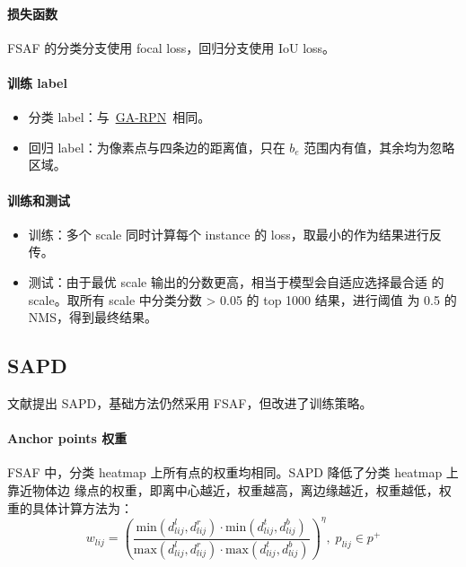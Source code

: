 \paragraph{损失函数}
FSAF 的分类分支使用 focal loss，回归分支使用 IoU loss。

\paragraph{训练 label}
\begin{itemize}
\item 分类 label：与~\hyperref[subsubsec:GA-RPN]{GA-RPN}~相同。
  \item 回归 label：为像素点与四条边的距离值，只在 $b_e$ 范围内有值，其余均为忽略区域。
\end{itemize}

\paragraph{训练和测试}
\begin{itemize}
  \item 训练：多个 scale 同时计算每个 instance 的 loss，取最小的作为结果进行反传。
  \item 测试：由于最优 scale 输出的分数更高，相当于模型会自适应选择最合适
    的 scale。取所有 scale 中分类分数 > 0.05 的 top 1000 结果，进行阈值
    为 0.5 的 NMS，得到最终结果。
\end{itemize}

\subsection{SAPD}
文献提出 SAPD，基础方法仍然采用 FSAF，但改进了训练策略。

\paragraph{Anchor points 权重}
FSAF 中，分类 heatmap 上所有点的权重均相同。SAPD 降低了分类 heatmap 上靠近物体边
缘点的权重，即离中心越近，权重越高，离边缘越近，权重越低，权重的具体计算方法为：
\begin{equation}
  w_{lij} = \left( \frac{\mathrm{min} \left( d_{lij}^l, d_{lij}^r \right) \cdot \mathrm{min} \left( d_{lij}^t, d_{lij}^b \right)}{\mathrm{max} \left( d_{lij}^l, d_{lij}^r \right) \cdot \mathrm{max} \left( d_{lij}^t, d_{lij}^b \right)} \right)^{\eta}, \; p_{lij} \in p^+
\end{equation}


